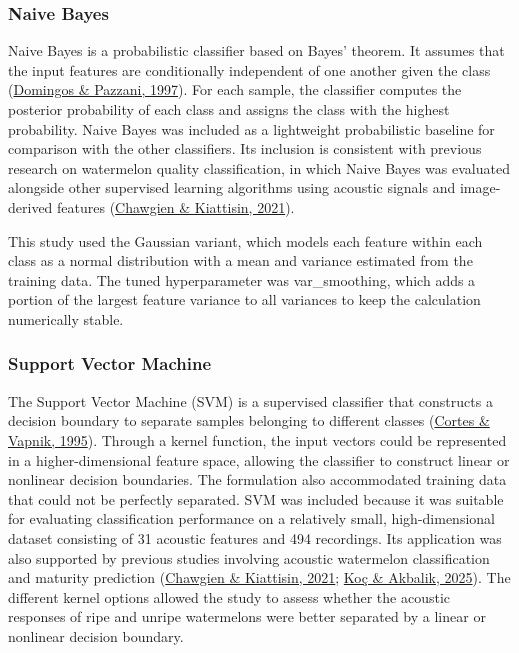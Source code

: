 \begin{thesisprose}
\subsubsection*{Naive Bayes}

Naive Bayes is a probabilistic classifier based on Bayes' theorem. It assumes that the input features are conditionally independent of one another given the class (\hyperlink{cite.domingos1997}{Domingos \& Pazzani, 1997}). For each sample, the classifier computes the posterior probability of each class and assigns the class with the highest probability. Naive Bayes was included as a lightweight probabilistic baseline for comparison with the other classifiers. Its inclusion is consistent with previous research on watermelon quality classification, in which Naive Bayes was evaluated alongside other supervised learning algorithms using acoustic signals and image-derived features (\hyperlink{cite.chawgien2021}{Chawgien \& Kiattisin, 2021}).

This study used the Gaussian variant, which models each feature within each class as a normal distribution with a mean and variance estimated from the training data. The tuned hyperparameter was var\_\allowbreak{}smoothing, which adds a portion of the largest feature variance to all variances to keep the calculation numerically stable.

\subsubsection*{Support Vector Machine}

The Support Vector Machine (SVM) is a supervised classifier that constructs a decision boundary to separate samples belonging to different classes (\hyperlink{cite.cortes1995}{Cortes \& Vapnik, 1995}). Through a kernel function, the input vectors could be represented in a higher-dimensional feature space, allowing the classifier to construct linear or nonlinear decision boundaries. The formulation also accommodated training data that could not be perfectly separated. SVM was included because it was suitable for evaluating classification performance on a relatively small, high-dimensional dataset consisting of 31 acoustic features and 494 recordings. Its application was also supported by previous studies involving acoustic watermelon classification and maturity prediction (\hyperlink{cite.chawgien2021}{Chawgien \& Kiattisin, 2021}; \hyperlink{cite.koc2025}{Koç \& Akbalik, 2025}). The different kernel options allowed the study to assess whether the acoustic responses of ripe and unripe watermelons were better separated by a linear or nonlinear decision boundary.


\end{thesisprose}
